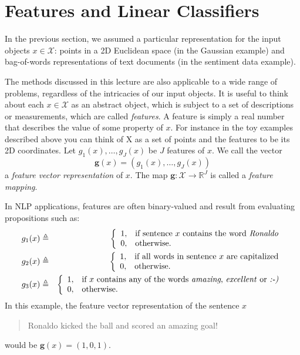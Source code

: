 \section{Features and Linear Classifiers}\label{sec:linearclass}

In the previous section, we assumed a particular representation for 
the input objects  $x \in \mathcal{X}$: points in a 2D Euclidean space 
(in the Gaussian example) and bag-of-words representations of text 
documents (in the sentiment data example). 

The methods discussed in this lecture are also applicable to a 
wide range of problems, regardless of the intricacies of our input objects. 
It is useful to think about each  $x \in \mathcal{X}$ as an abstract object, 
which is subject to a set of descriptions or measurements, which are called \emph{features}.  
A feature is simply a real number that describes the value of some
property of $x$. 
For instance in the toy examples described above you can think of X
as a set of points and the features to be its 2D coordinates.
Let $g_1(x),\ldots,g_J(x)$ be $J$ features of $x$. We call the vector
\begin{equation}
\boldsymbol{g}(x) = (g_1(x),\ldots,g_J(x))
\end{equation} 
a \emph{feature vector representation} of $x$. 
The map $\boldsymbol{g}:\mathcal{X}\rightarrow \mathbb{R}^J$ is called a \emph{feature mapping}. 

In NLP applications, features are often binary-valued and 
result from evaluating propositions such as: 
\begin{eqnarray}
g_1(x) &\triangleq& 
\left\{
\begin{array}{ll}
1, & \text{if sentence $x$ contains the word \emph{Ronaldo}}\\
0, & \text{otherwise.}
\end{array}
\right.\\
g_2(x) &\triangleq& 
\left\{
\begin{array}{ll}
1, & \text{if all words in sentence $x$ are capitalized}\\
0, & \text{otherwise.}
\end{array}
\right.\\
g_3(x) &\triangleq& 
\left\{
\begin{array}{ll}
1, & \text{if $x$ contains any of the words \emph{amazing}, \emph{excellent} or \emph{:-)}}\\
0, & \text{otherwise.}
\end{array}
\right.
\end{eqnarray}  
In this example, the feature vector representation of the sentence $x$
\begin{quote}
Ronaldo kicked the ball and scored an amazing goal! 
\end{quote}
would be $\boldsymbol{g}(x) = (1,0,1)$. 

